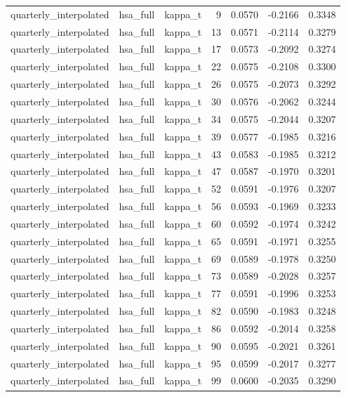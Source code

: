 \begin{tabular}{lllrrrr}
quarterly\_interpolated & hsa\_full & kappa\_t & 9 & 0.0570 & -0.2166 & 0.3348 \\
quarterly\_interpolated & hsa\_full & kappa\_t & 13 & 0.0571 & -0.2114 & 0.3279 \\
quarterly\_interpolated & hsa\_full & kappa\_t & 17 & 0.0573 & -0.2092 & 0.3274 \\
quarterly\_interpolated & hsa\_full & kappa\_t & 22 & 0.0575 & -0.2108 & 0.3300 \\
quarterly\_interpolated & hsa\_full & kappa\_t & 26 & 0.0575 & -0.2073 & 0.3292 \\
quarterly\_interpolated & hsa\_full & kappa\_t & 30 & 0.0576 & -0.2062 & 0.3244 \\
quarterly\_interpolated & hsa\_full & kappa\_t & 34 & 0.0575 & -0.2044 & 0.3207 \\
quarterly\_interpolated & hsa\_full & kappa\_t & 39 & 0.0577 & -0.1985 & 0.3216 \\
quarterly\_interpolated & hsa\_full & kappa\_t & 43 & 0.0583 & -0.1985 & 0.3212 \\
quarterly\_interpolated & hsa\_full & kappa\_t & 47 & 0.0587 & -0.1970 & 0.3201 \\
quarterly\_interpolated & hsa\_full & kappa\_t & 52 & 0.0591 & -0.1976 & 0.3207 \\
quarterly\_interpolated & hsa\_full & kappa\_t & 56 & 0.0593 & -0.1969 & 0.3233 \\
quarterly\_interpolated & hsa\_full & kappa\_t & 60 & 0.0592 & -0.1974 & 0.3242 \\
quarterly\_interpolated & hsa\_full & kappa\_t & 65 & 0.0591 & -0.1971 & 0.3255 \\
quarterly\_interpolated & hsa\_full & kappa\_t & 69 & 0.0589 & -0.1978 & 0.3250 \\
quarterly\_interpolated & hsa\_full & kappa\_t & 73 & 0.0589 & -0.2028 & 0.3257 \\
quarterly\_interpolated & hsa\_full & kappa\_t & 77 & 0.0591 & -0.1996 & 0.3253 \\
quarterly\_interpolated & hsa\_full & kappa\_t & 82 & 0.0590 & -0.1983 & 0.3248 \\
quarterly\_interpolated & hsa\_full & kappa\_t & 86 & 0.0592 & -0.2014 & 0.3258 \\
quarterly\_interpolated & hsa\_full & kappa\_t & 90 & 0.0595 & -0.2021 & 0.3261 \\
quarterly\_interpolated & hsa\_full & kappa\_t & 95 & 0.0599 & -0.2017 & 0.3277 \\
quarterly\_interpolated & hsa\_full & kappa\_t & 99 & 0.0600 & -0.2035 & 0.3290 \\

\end{tabular}

